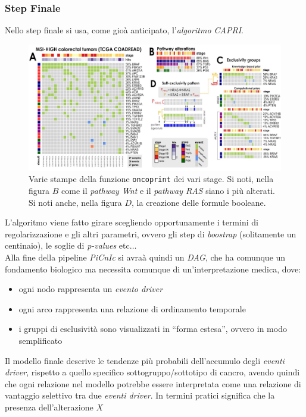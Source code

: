 \documentclass[a4paper,12pt, oneside]{book}
\begin{document}
\subsubsection{Step Finale}
Nello step finale si usa, come gioà anticipato, l'\textit{algoritmo CAPRI}.\\
\begin{figure}
  \centering
  \includegraphics[scale = 0.21]{img/onco.jpg}
  \caption{Varie stampe della funzione \texttt{oncoprint} dei vari stage. Si
    noti, nella figura $B$ come il \textit{pathway Wnt} e il \textit{pathway
      RAS} siano i più alterati. Si noti anche, nella figura $D$, la creazione
    delle formule booleane.}
\end{figure}
L'algoritmo viene fatto girare scegliendo opportunamente i termini di
regolarizzazione e gli altri parametri, ovvero gli step di \textit{boostrap}
(solitamente un centinaio), le
soglie di \textit{p-values} etc$\ldots$\\
Alla fine della pipeline \textit{PiCnIc} si avraà quindi un \textit{DAG}, che ha
comunque un fondamento biologico ma necessita comunque di un'interpretazione
medica, dove:
\begin{itemize}
  \item ogni nodo rappresenta un \textit{evento driver}
  \item ogni arco rappresenta una relazione di ordinamento temporale 
  \item i gruppi di esclusività sono visualizzati in ``forma estesa'', ovvero in
  modo semplificato
\end{itemize}
Il modello finale descrive le tendenze più probabili dell'accumulo degli
\textit{eventi driver}, rispetto a quello specifico sottogruppo/sottotipo di
cancro, avendo quindi che ogni relazione nel modello potrebbe essere
interpretata come una relazione di vantaggio selettivo tra due \textit{eventi
  driver}. In termini pratici significa che la presenza dell'alterazione $X$
\end{document}
